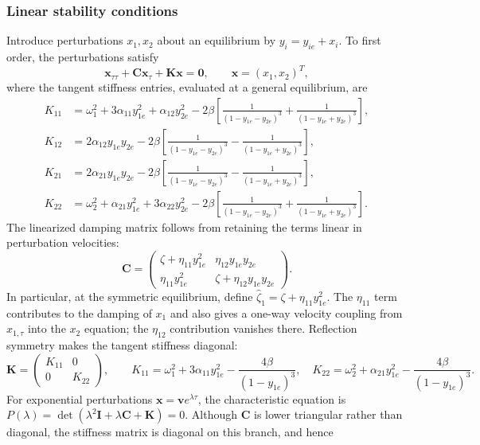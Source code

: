 \documentclass[11pt]{article}
\begin{document}
\subsubsection*{Linear stability conditions}
Introduce perturbations $x_1,x_2$ about an equilibrium by $y_i=y_{ie}+x_i$. To first order, the perturbations satisfy
\begin{equation}\label{eq:linearized-system}
\mathbf{x}_{\tau\tau}+\mathbf{C}\mathbf{x}_{\tau}+\mathbf{K}\mathbf{x}=\mathbf{0},
\qquad \mathbf{x}=(x_1,x_2)^T,
\end{equation}
where the tangent stiffness entries, evaluated at a general equilibrium, are
\begin{align*}
K_{11}&=\omega_1^2+3\alpha_{11}y_{1e}^2+\alpha_{12}y_{2e}^2
-2\beta\left[\frac{1}{(1-y_{1e}-y_{2e})^3}+\frac{1}{(1-y_{1e}+y_{2e})^3}\right],\\
K_{12}&=2\alpha_{12}y_{1e}y_{2e}
-2\beta\left[\frac{1}{(1-y_{1e}-y_{2e})^3}-\frac{1}{(1-y_{1e}+y_{2e})^3}\right],\\
K_{21}&=2\alpha_{21}y_{1e}y_{2e}
-2\beta\left[\frac{1}{(1-y_{1e}-y_{2e})^3}-\frac{1}{(1-y_{1e}+y_{2e})^3}\right],\\
K_{22}&=\omega_2^2+\alpha_{21}y_{1e}^2+3\alpha_{22}y_{2e}^2
-2\beta\left[\frac{1}{(1-y_{1e}-y_{2e})^3}+\frac{1}{(1-y_{1e}+y_{2e})^3}\right].
\end{align*}
The linearized damping matrix follows from retaining the terms linear in perturbation velocities:
\[
\mathbf{C}=\begin{pmatrix}
\zeta+\eta_{11}y_{1e}^2 & \eta_{12}y_{1e}y_{2e}\\
\eta_{11}y_{1e}^2 & \zeta+\eta_{12}y_{1e}y_{2e}
\end{pmatrix}.
\]
In particular, at the symmetric equilibrium, define $\widehat{\zeta}_1=\zeta+\eta_{11}y_{1e}^2$. The $\eta_{11}$ term contributes to the damping of $x_1$ and also gives a one-way velocity coupling from $x_{1,\tau}$ into the $x_2$ equation; the $\eta_{12}$ contribution vanishes there. Reflection symmetry makes the tangent stiffness diagonal:
\begin{equation}\label{eq:symmetric-stiffness}
\mathbf{K}=\begin{pmatrix}K_{11}&0\\0&K_{22}\end{pmatrix},\qquad
K_{11}=\omega_1^2+3\alpha_{11}y_{1e}^2-\frac{4\beta}{(1-y_{1e})^3},\quad
K_{22}=\omega_2^2+\alpha_{21}y_{1e}^2-\frac{4\beta}{(1-y_{1e})^3}.
\end{equation}
For exponential perturbations $\mathbf{x}=\mathbf{v}e^{\lambda\tau}$, the characteristic equation is $P(\lambda)=\det(\lambda^2\mathbf{I}+\lambda\mathbf{C}+\mathbf{K})=0$. Although $\mathbf{C}$ is lower triangular rather than diagonal, the stiffness matrix is diagonal on this branch, and hence
\end{document}
